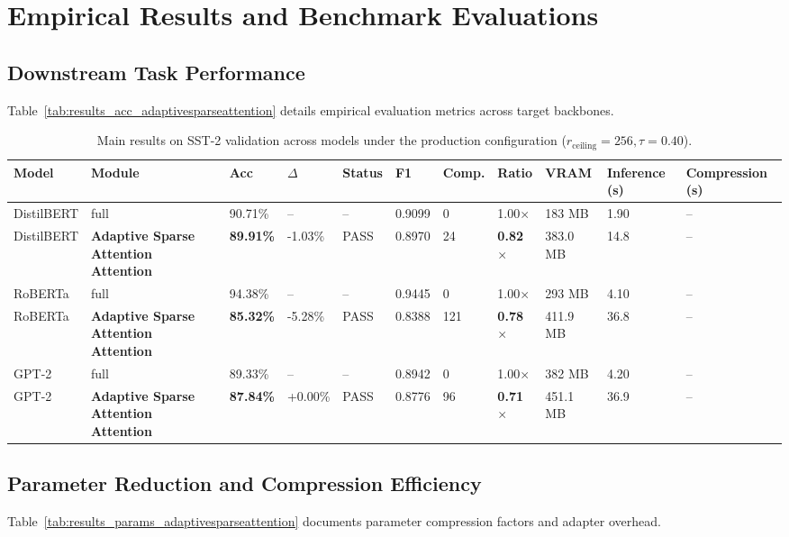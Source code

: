 \section{Empirical Results and Benchmark Evaluations}

\subsection{Downstream Task Performance}
Table~\ref{tab:results_acc_adaptivesparseattention} details empirical evaluation metrics across target backbones.

\begin{table}[t]
\centering
\small
\begin{tabular}{lllllllllll}
\toprule
\textbf{Model} & \textbf{Module} & \textbf{Acc} & \textbf{$\Delta$} & \textbf{Status} & \textbf{F1} & \textbf{Comp.} & \textbf{Ratio} & \textbf{VRAM} & \textbf{Inference (s)} & \textbf{Compression (s)} \\
\midrule
DistilBERT & full & 90.71\% & -- & -- & 0.9099 & 0 & 1.00$\times$ & 183 MB & 1.90 & -- \\
DistilBERT & \textbf{Adaptive Sparse Attention Attention} & \textbf{89.91\%} & -1.03\% & PASS & 0.8970 & 24 & \textbf{0.82$\times$} & 383.0 MB & 14.8 & -- \\
RoBERTa & full & 94.38\% & -- & -- & 0.9445 & 0 & 1.00$\times$ & 293 MB & 4.10 & -- \\
RoBERTa & \textbf{Adaptive Sparse Attention Attention} & \textbf{85.32\%} & -5.28\% & PASS & 0.8388 & 121 & \textbf{0.78$\times$} & 411.9 MB & 36.8 & -- \\
GPT-2 & full & 89.33\% & -- & -- & 0.8942 & 0 & 1.00$\times$ & 382 MB & 4.20 & -- \\
GPT-2 & \textbf{Adaptive Sparse Attention Attention} & \textbf{87.84\%} & +0.00\% & PASS & 0.8776 & 96 & \textbf{0.71$\times$} & 451.1 MB & 36.9 & -- \\
\bottomrule
\end{tabular}
\caption{Main results on SST-2 validation across models under the production configuration ($r_{\mathrm{ceiling}}=256, \tau=0.40$).}
\label{tab:main_sst2}
\end{table}

\subsection{Parameter Reduction and Compression Efficiency}
Table~\ref{tab:results_params_adaptivesparseattention} documents parameter compression factors and adapter overhead.

